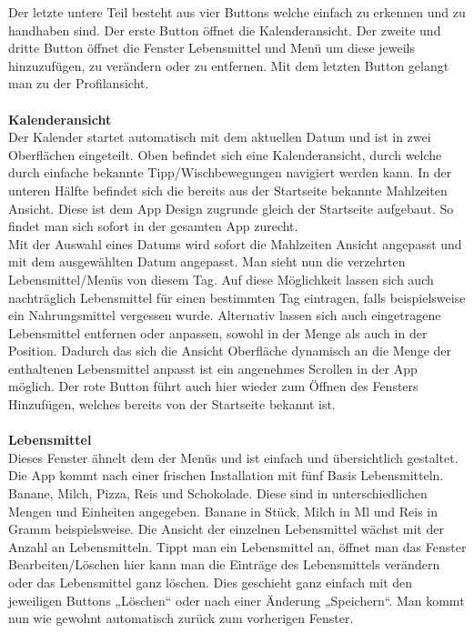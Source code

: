 Der letzte untere Teil besteht aus vier Buttons welche einfach zu erkennen und zu handhaben sind. Der erste Button öffnet die Kalenderansicht. Der zweite und dritte Button öffnet die Fenster Lebensmittel und Menü um diese jeweils hinzuzufügen, zu verändern oder zu entfernen. Mit dem letzten Button gelangt man zu der Profilansicht. \\
\\
\textbf{Kalenderansicht} \\
Der Kalender startet automatisch mit dem aktuellen Datum und ist in zwei Oberflächen eingeteilt. Oben befindet sich eine Kalenderansicht, durch welche durch einfache bekannte Tipp/Wischbewegungen navigiert werden kann. In der unteren Hälfte befindet sich die bereits aus der Startseite bekannte Mahlzeiten Ansicht. Diese ist dem App Design zugrunde gleich der Startseite aufgebaut. So findet man sich sofort in der gesamten App zurecht. \\
Mit der Auswahl eines Datums wird sofort die Mahlzeiten Ansicht angepasst und mit dem ausgewählten Datum angepasst. Man sieht nun die verzehrten Lebensmittel/Menüs von diesem Tag. Auf diese Möglichkeit lassen sich auch nachträglich Lebensmittel für einen bestimmten Tag eintragen, falls beispielsweise ein Nahrungsmittel vergessen wurde. Alternativ lassen sich auch eingetragene Lebensmittel entfernen oder anpassen, sowohl in der Menge als auch in der Position. Dadurch das sich die Ansicht Oberfläche dynamisch an die Menge der enthaltenen Lebensmittel anpasst ist ein angenehmes Scrollen in der App möglich. Der rote Button führt auch hier wieder zum Öffnen des Fensters Hinzufügen, welches bereits von der Startseite bekannt ist.\\
\\
\textbf{Lebensmittel} \\
Dieses Fenster ähnelt dem der Menüs und ist einfach und übersichtlich gestaltet. Die App kommt nach einer frischen Installation mit fünf Basis Lebensmitteln. Banane, Milch, Pizza, Reis und Schokolade. Diese sind in unterschiedlichen Mengen und Einheiten angegeben. Banane in Stück, Milch in Ml und Reis in Gramm beispielsweise. Die Ansicht der einzelnen Lebensmittel wächst mit der Anzahl an Lebensmitteln. Tippt man ein Lebensmittel an, öffnet man das Fenster Bearbeiten/Löschen hier kann man die Einträge des Lebensmittels verändern oder das Lebensmittel ganz löschen. Dies geschieht ganz einfach mit den jeweiligen Buttons „Löschen“ oder nach einer Änderung „Speichern“. Man kommt nun wie gewohnt automatisch zurück zum vorherigen Fenster. \\
